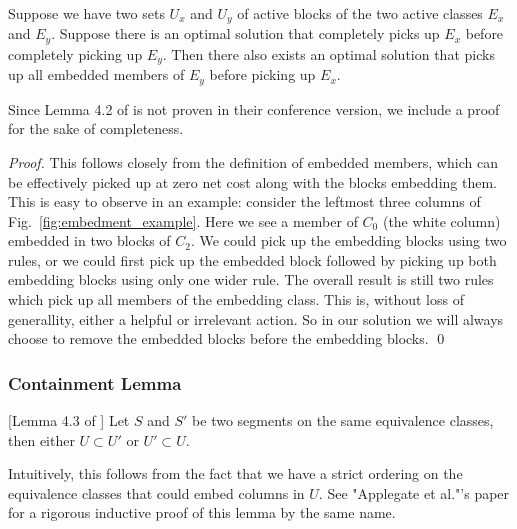 \subsubsection{}
\begin{proposition} 
\label{p_embed}
Suppose we have two sets $U_x$ and $U_y$
of active blocks of the two active classes $E_x$ and $E_y$.
Suppose there is an optimal solution that completely picks up $E_x$ before
completely picking up $E_y$.
Then there also exists an optimal solution that picks up all embedded
members of $E_y$ before picking up $E_x$.
\end{proposition}
Since Lemma 4.2 of \cite{ACJKLW07} is not proven in their conference version,
we include a proof for the sake of completeness.
\begin{proof}
This follows closely from the definition of embedded members, which can be
effectively picked up at zero net cost along with the blocks embedding them.
This is easy to observe in an example: consider the leftmost three columns
of Fig.~\ref{fig:embedment_example}.
Here we see a member of $C_0$ (the white column) embedded in two blocks of
$C_2$.
We could pick up the embedding blocks using two rules, or we could first
pick up the embedded block followed by picking up both embedding blocks
using only one wider rule.
The overall result is still two rules which pick up all members of the
embedding class.
This is, without loss of generallity, either a helpful or irrelevant action.
So in our solution we will always choose to remove the embedded blocks
before the embedding blocks.
\qed
\end{proof}


\subsubsection{Containment Lemma} [Lemma 4.3 of \cite{ACJKLW07}]
\label{ss_cont}
Let $S$ and $S'$ be two segments on the same equivalence classes, then either $U \subset U'$ or $U' \subset U$.

Intuitively,
this follows from the fact that we have a strict ordering on the equivalence classes that could embed columns in $U$. See "Applegate et al."'s paper
\cite{ACJKLW07} for a rigorous inductive proof of this lemma by the same name.
